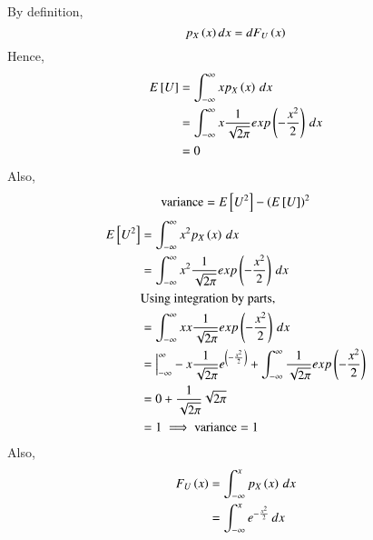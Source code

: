 \documentclass[journal,12pt,twocolumn]{IEEEtran}
\begin{document}
\solution
By definition,
\begin{equation}
    p_{X}\left(x\right)dx = dF_{U}\left(x\right)
\end{equation}
Hence,
\begin{align}
    E{}\left[U\right] &= \int_{-\infty}^{\infty} x p_{X}\left(x\right) \,dx \\
               &= \int_{-\infty}^{\infty} x \frac{1}{\sqrt{2\pi}}exp\left(-\frac{x^2}{2}\right) \,dx \\
               &= 0
\end{align}
Also,
\begin{equation}
    \text{variance} = E{}\left[U^2\right] - \left(E{}\left[U\right]\right)^2
\end{equation}
\begin{align}
   E{}\left[U^2\right] &=  \int_{-\infty}^{\infty} x^2 p_{X}\left(x\right) \,dx \\
                &= \int_{-\infty}^{\infty} x^2 \frac{1}{\sqrt{2\pi}}exp\left(-\frac{x^2}{2}\right) \,dx \\
                &\text{Using integration by parts,} \\
                &= \int_{-\infty}^{\infty} x x\frac{1}{\sqrt{2\pi}}exp\left(-\frac{x^2}{2}\right) \,dx \\
                &= \Big|_{-\infty}^{\infty}-x\frac{1}{\sqrt{2\pi}}e^{\left(-\frac{x^2}{2}\right)}  +  \int_{-\infty}^{\infty} \frac{1}{\sqrt{2\pi}}exp\left(-\frac{x^2}{2}\right) \\
                &= 0 + \frac{1}{\sqrt{2\pi}}\sqrt{2\pi} \\
                &= 1
    \implies \text{variance} = 1
\end{align}
Also,
\begin{align}
   F_{U}\left(x\right) &=  \int_{-\infty}^{x} p_{X}\left(x\right) \,dx  \\
                 &= \int_{-\infty}^{x} e^{-\frac{x^2}{2}}\,dx 
\end{align}
\end{document}
